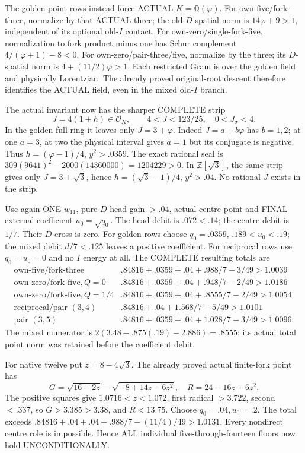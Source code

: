 \documentclass[11pt]{article}
\begin{document}
The golden point rows instead force
ACTUAL \(K=\mathbb Q(\varphi)\).
For own-five/fork-three, normalize by
that ACTUAL three; the old-\(D\) spatial
norm is \(14\varphi+9>1\), independent
of its optional old-\(I\) contact.
For own-zero/single-fork-five, normalization
to fork product minus one has
Schur complement \(4/(\varphi+1)-8<0\).
For own-zero/pair-three/five, normalize
by the three; its \(D\)-spatial norm
is \(4+(11/2)\varphi>1\).
Each restricted Gram is over the golden
field and physically Lorentzian.
The already proved original-root descent
therefore identifies the ACTUAL field,
even in the mixed old-\(I\) branch.

The actual invariant now has the
sharper COMPLETE strip
\[
                   J=4(1+h)\in\mathcal O_K,\qquad
                   4<J<123/25,\quad0<J_\sigma<4 .
\tag{D16IJ}\label{eq:arithD16Istrip}
\]
In the golden full ring it leaves only
\(J=3+\varphi\).
Indeed \(J=a+b\varphi\) has \(b=1,2\);
at one \(a=3\), at two the physical
interval gives \(a=1\) but its conjugate
is negative.
Thus \(h=(\varphi-1)/4\), \(y^2>.0359\).
The exact rational seal is
\(309(9641)^2-2000(14360000)=1204229>0\).
In \(\mathbb Z[\sqrt3]\), the same strip
gives only \(J=3+\sqrt3\), hence
\(h=(\sqrt3-1)/4\), \(y^2>.04\).
No rational \(J\) exists in the strip.

Use again ONE \(w_{11}\), pure-\(D\)
head gain \(>.04\), actual centre point
and FINAL external coefficient
\(u_0=\sqrt{q_0}\).
The head debit is \(.072<.14\);
the centre debit is \(1/7\).
Their \(D\)-cross is zero.
For golden rows choose \(q_0=.0359\),
\(.189<u_0<.19\); the mixed debit
\(d/7<.125\) leaves a positive coefficient.
For reciprocal rows use \(q_0=u_0=0\)
and no \(I\) energy at all.
The COMPLETE resulting totals are
\[
\begin{array}{c|l}
 \text{own-five/fork-three}&
 .84816+.0359+.04+.988/7-3/49>1.0039\\
 \text{own-zero/fork-five},Q=0&
 .84816+.0359+.04+.948/7-2/49>1.0186\\
 \text{own-zero/fork-five},Q=1/4&
 .84816+.0359+.04+.8555/7-2/49>1.0054\\
 \text{reciprocal/pair }(3,4)&
 .84816+.04+1.568/7-5/49>1.0101\\
 \text{pair }(3,5)&
 .84816+.0359+.04+1.028/7-3/49>1.0096 .
\end{array}
\]
The mixed numerator is
\(2(3.48-.875(.19)-2.886)=.8555\);
its actual total point norm was
retained before the coefficient debit.

For native twelve put \(z=8-4\sqrt3\).
The already proved actual finite-fork
point has
\[
 G=\sqrt{16-2z}-\sqrt{-8+14z-6z^2},\quad
                         R=24-16z+6z^2 .
\]
The positive squares give
\(1.0716<z<1.072\), first radical
\(>3.722\), second \(<.337\), so
\(G>3.385>3.38\), and \(R<13.75\).
Choose \(q_0=.04,u_0=.2\).
The total exceeds
\(.84816+.04+.04+.988/7-(11/4)/49>1.0131\).
Every nondirect centre role is impossible.
Hence ALL individual five-through-fourteen
floors now hold UNCONDITIONALLY.
\end{document}
